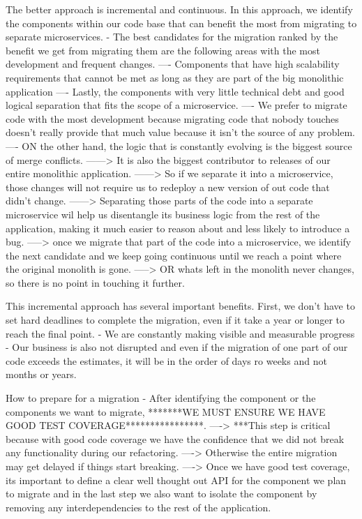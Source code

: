\documentclass[a4paper, 11pt]{book}
\begin{document}
    The better approach is incremental and continuous.
    In this approach, we identify the components within our code base that can benefit the most from migrating to separate microservices.
    - The best candidates for the migration ranked by the benefit we get from migrating them are the following areas with the most development and frequent changes.
    ---- Components that have high scalability requirements that cannot be met as long as they are part of the big monolithic application
    ---- Lastly, the components with very little technical debt and good logical separation that fits the scope of a microservice.
    ---- We prefer to migrate code with the most development because migrating code that nobody touches doesn't really provide that much value because it isn't the source of any problem.
    ---- ON the other hand, the logic that is constantly evolving is the biggest source of merge conflicts.
    ------> It is also the biggest contributor to releases of our entire monolithic application.
    ------> So if we separate it into a microservice, those changes will not require us to redeploy a new version of out code that didn't change.
    ------> Separating those parts of the code into a separate microservice wil help us disentangle its business logic from the rest of the application, making it much easier to reason about and less likely to introduce a bug.
    -----> once we migrate that part of the code into a microservice, we identify the next candidate and we keep going continuous until we reach a point where the original monolith is gone.
    -----> OR whats left in the monolith never changes, so there is no point in touching it further.

    This incremental approach has several important benefits.
    First, we don't have to set hard deadlines to complete the migration, even if it take a year or longer to reach the final point.
    - We are constantly making visible and measurable progress
    - Our business is also not disrupted and even if the migration of one part of our code exceeds the estimates, it will be in the order of days ro weeks and not months or years.

    How to prepare for a migration
    - After identifying the component or the components we want to migrate, *******WE MUST ENSURE WE HAVE GOOD TEST COVERAGE****************.
    ----> ***This step is critical because with good code coverage we have the confidence that we did not break any functionality during our refactoring.
    ----> Otherwise the entire migration may get delayed if things start breaking.
    ----> Once we have good test coverage, its important to define a clear well thought out API for the component we plan to migrate and in the last step we also want to isolate the component by removing any interdependencies to the rest of the application.
\end{document}
